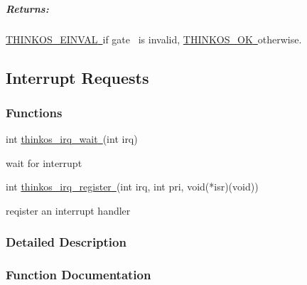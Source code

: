 {\protect\hypertarget{t.1aebe24dda1b56316fca09844ec7bf63e4290b0d}{}{}\protect\hypertarget{t.48}{}{}

\begin{longtable}[]{@{}l@{}}
\toprule
\begin{minipage}[t]{0.97\columnwidth}\raggedright\strut
{}\strut
\end{minipage}\tabularnewline
\bottomrule
\end{longtable}

\subparagraph{\texorpdfstring{{Returns:}}{Returns:}}\label{returns-49}

{\protect\hyperlink{h.1tuee74}{THINKOS\_EINVAL}}{\protect\hyperlink{h.1tuee74}{~}}{if
}{gate}{~ is invalid,
}{\protect\hyperlink{h.2fk6b3p}{THINKOS\_OK}}{\protect\hyperlink{h.2fk6b3p}{~}}{otherwise.
}

\paragraph{\texorpdfstring{{}}{}}\label{section-7}

\subsection{\texorpdfstring{{Interrupt
Requests}}{Interrupt Requests}}\label{interrupt-requests}

\subsubsection{\texorpdfstring{{Functions}}{Functions}}\label{h.1664s55}

{int
}{\protect\hyperlink{h.3q5sasy}{thinkos\_irq\_wait}}{\protect\hyperlink{h.3q5sasy}{~}}{(int
irq)}

{wait for interrupt }

{int
}{\protect\hyperlink{h.25b2l0r}{thinkos\_irq\_register}}{\protect\hyperlink{h.25b2l0r}{~}}{(int
irq, int pri, void(*isr)(void))}

{reqister an interrupt handler }

{}

\subsubsection{\texorpdfstring{{Detailed
Description}}{Detailed Description}}\label{detailed-description-8}

{}

{}

\subsubsection{\texorpdfstring{{Function
Documentation}}{Function Documentation}}\label{function-documentation-8}

}
